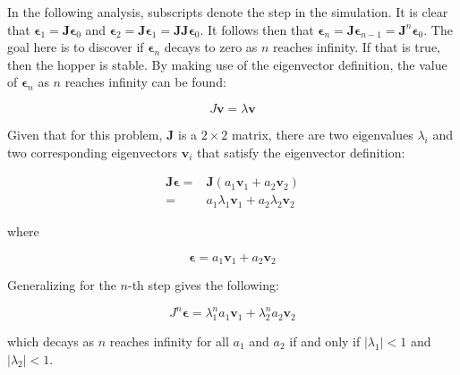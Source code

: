 In the following analysis, subscripts denote the step in the simulation. It is
clear that $\mathbf{\epsilon}_{1} = \mathbf{J}\mathbf{\epsilon}_{0}$ and
$\mathbf{\epsilon}_{2} = \mathbf{J}\mathbf{\epsilon}_{1} =
\mathbf{J}\mathbf{J}\mathbf{\epsilon}_{0}$.  It follows then that
$\mathbf{\epsilon}_{n} = \mathbf{J}\mathbf{\epsilon}_{n-1} =
\mathbf{J}^{n}\mathbf{\epsilon}_{0}$.  The goal here is to discover if
$\mathbf{\epsilon}_{n}$ decays to zero as $n$ reaches infinity.  If that is
true, then the hopper is stable. By making use of the eigenvector definition,
the value of $\mathbf{\epsilon}_{n}$ as $n$ reaches infinity can be found:

\begin{equation*}
    J \mathbf{v} = \lambda \mathbf{v}
\end{equation*}

Given that for this problem, $\mathbf{J}$ is a $2 \times 2$ matrix, there are
two eigenvalues $\lambda_i$ and two corresponding eigenvectors $\mathbf{v}_i$
that satisfy the eigenvector definition:


\begin{align*}
    \mathbf{J} \mathbf{\epsilon} =& \mathbf{J} (a_{1}\mathbf{v}_{1}+a_{2}\mathbf{v}_{2}) \\
=&a_{1}\lambda_{1}\mathbf{v}_{1}+a_{2}\lambda_{2}\mathbf{v}_{2}
\end{align*}

where

\begin{equation*}
    \mathbf{\epsilon} = a_1 \mathbf{v}_1 + a_2 \mathbf{v}_2
\end{equation*}

Generalizing for the $n$-th step gives the following:

\begin{equation*}
    J^{n}\mathbf{\epsilon} = \lambda_{1}^{n}a_{1}\mathbf{v}_{1}+\lambda_{2}^{n}a_{2}\mathbf{v}_{2}
\end{equation*}

which decays as $n$ reaches infinity for all $a_{1}$ and $a_{2}$ if and only if
$|\lambda_{1}| < 1$ and $|\lambda_{2}| < 1$.

